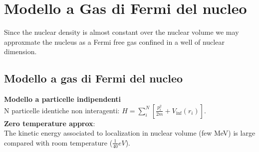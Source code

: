 \documentclass[main.tex]{subfiles}
\begin{document}
\section{Modello a Gas di Fermi del nucleo}

Since the nuclear density is almost constant over the nuclear volume we may approxmate the nucleus as a Fermi free gas confined in a well of nuclear dimension.

\subsection{Modello a gas di Fermi del  nucleo}
\textbf{Modello a particelle indipendenti}\\
N particelle identiche non interagenti: $H=\sum_i^N [ \frac{p_i^2}{2m}+V_{\inf}(r_i)]$.\\
\textbf{Zero temperature approx}:\\
The kinetic energy associated to localization in nuclear volume (few MeV) is large compared with room temperature ($\frac{1}{40} eV$).
\end{document}
